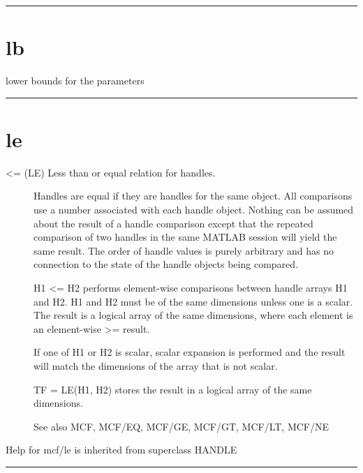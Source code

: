 \documentclass[letterpaper,10pt,english]{sphinxmanual}
\begin{document}
\bigskip\hrule{}\bigskip



\section{lb}
\label{classes/utils/@mcf/mcf:id19}\label{classes/utils/@mcf/mcf:lb}
lower bounds for the parameters


\bigskip\hrule{}\bigskip



\section{le}
\label{classes/utils/@mcf/mcf:id20}\label{classes/utils/@mcf/mcf:le}\begin{description}
\item[{\textless{}= (LE)   Less than or equal relation for handles.}] \leavevmode
Handles are equal if they are handles for the same object.  All
comparisons use a number associated with each handle object.  Nothing
can be assumed about the result of a handle comparison except that the
repeated comparison of two handles in the same MATLAB session will
yield the same result.  The order of handle values is purely arbitrary
and has no connection to the state of the handle objects being
compared.

H1 \textless{}= H2 performs element-wise comparisons between handle arrays H1 and
H2.  H1 and H2 must be of the same dimensions unless one is a scalar.
The result is a logical array of the same dimensions, where each
element is an element-wise \textgreater{}= result.

If one of H1 or H2 is scalar, scalar expansion is performed and the
result will match the dimensions of the array that is not scalar.

TF = LE(H1, H2) stores the result in a logical array of the same
dimensions.

See also MCF, MCF/EQ, MCF/GE, MCF/GT, MCF/LT, MCF/NE

\end{description}

Help for mcf/le is inherited from superclass HANDLE


\bigskip\hrule{}\bigskip
\end{document}
